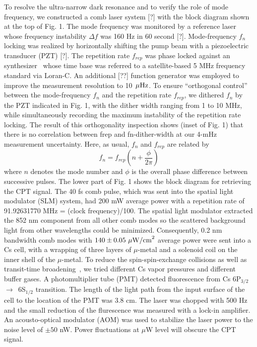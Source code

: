 \documentclass[%
aps,
prl,
showpacs,
twocolumn,
]{revtex4}
\begin{document}
To resolve the ultra-narrow dark resonance and to verify the role of mode 
frequency, we constructed a comb laser system [?] with the block diagram shown 
at the top of Fig. 1. The mode frequency was monitored by a reference laser 
whose frequency instability $\Delta f$ was 160 Hz in 60 second [?]. Mode-frequency $f_n$ 
locking was realized by horizontally shifting the pump beam with a piezoelectric 
transducer (PZT) [?]. The repetition rate $f_{rep}$ was phase locked against an 
synthesizer~ whose time base was referred to a satellite-based 5 MHz 
frequency standard via Loran-C. An additional [??] function generator was employed 
to improve the measurement resolution to 10~$\mu{\rm Hz}$. To ensure ``orthogonal control''
between the mode-frequency $f_n$ and the repetition rate $f_{rep}$, we dithered $f_n$ 
by the PZT indicated in Fig. 1, with the dither width ranging from 1 to 10 MHz, 
while simultaneously recording the maximum instability of the repetition rate 
locking. The result of this orthogonality inspection shows (inset of Fig. 1) 
that there is no correlation between frep and fn-dither-width at our 4-mHz measurement 
uncertainty. Here, as usual, $f_n$ and $f_{rep}$ are related by
\begin{equation*}
f_n = f_{rep}\left(n + \frac{\phi}{2\pi}\right)
\end{equation*}
where $n$ denotes the mode number and $\phi$ is the overall phase 
difference between successive pulses. The lower part of Fig. 1 shows the block 
diagram for retrieving the CPT signal. The 40 fs comb pulse, which was sent into
 the spatial light modulator (SLM) system, had 200 mW average power with a 
repetition rate of 91.92631770 MHz = (clock frequency)/100. The spatial light 
modulator extracted the 852 nm component from all other comb modes so the scattered 
background light from other wavelengths could be minimized. Consequently, 0.2 nm 
bandwidth comb modes with $140\pm0.05~\mu{\rm W/cm}^2$ average power were sent into a Cs cell, 
with a wrapping of three layers of $\mu$-metal and a solenoid coil on the inner 
shell of the $\mu$-metal. To reduce the spin-spin-exchange collisions as well as 
transit-time broadening~\cite{Hockel2009}, we tried different Cs vapor pressures and different 
buffer gases. A photomultiplier tube (PMT) detected fluorescence from
 Cs 6P$_{3/2}$~$\rightarrow$~6S$_{1/2}$ transition. The length of the light path from the input surface 
of the cell to the location of the PMT was 3.8 cm. The laser was chopped 
with 500 Hz and the small reduction of the flurescence was measured with a lock-in amplifier. An acousto-optical modulator (AOM) was used to 
stabilize the laser power to the noise level of $\pm 50$ nW. Power fluctuations at $\mu$W level will obscure the CPT signal.
\end{document}

